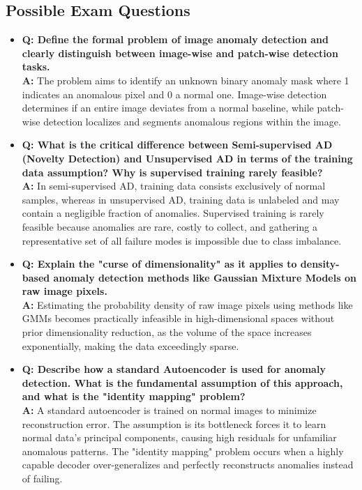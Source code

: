 \subsection{Possible Exam Questions}
\begin{itemize}
    \item \textbf{Q: Define the formal problem of image anomaly detection and clearly distinguish between image-wise and patch-wise detection tasks.} \\
    \textbf{A:} The problem aims to identify an unknown binary anomaly mask where 1 indicates an anomalous pixel and 0 a normal one. Image-wise detection determines if an entire image deviates from a normal baseline, while patch-wise detection localizes and segments anomalous regions within the image.
    
    \item \textbf{Q: What is the critical difference between Semi-supervised AD (Novelty Detection) and Unsupervised AD in terms of the training data assumption? Why is supervised training rarely feasible?} \\
    \textbf{A:} In semi-supervised AD, training data consists exclusively of normal samples, whereas in unsupervised AD, training data is unlabeled and may contain a negligible fraction of anomalies. Supervised training is rarely feasible because anomalies are rare, costly to collect, and gathering a representative set of all failure modes is impossible due to class imbalance.
    
    \item \textbf{Q: Explain the "curse of dimensionality" as it applies to density-based anomaly detection methods like Gaussian Mixture Models on raw image pixels.} \\
    \textbf{A:} Estimating the probability density of raw image pixels using methods like GMMs becomes practically infeasible in high-dimensional spaces without prior dimensionality reduction, as the volume of the space increases exponentially, making the data exceedingly sparse.
    
    \item \textbf{Q: Describe how a standard Autoencoder is used for anomaly detection. What is the fundamental assumption of this approach, and what is the "identity mapping" problem?} \\
    \textbf{A:} A standard autoencoder is trained on normal images to minimize reconstruction error. The assumption is its bottleneck forces it to learn normal data's principal components, causing high residuals for unfamiliar anomalous patterns. The "identity mapping" problem occurs when a highly capable decoder over-generalizes and perfectly reconstructs anomalies instead of failing.
    

\end{itemize}
